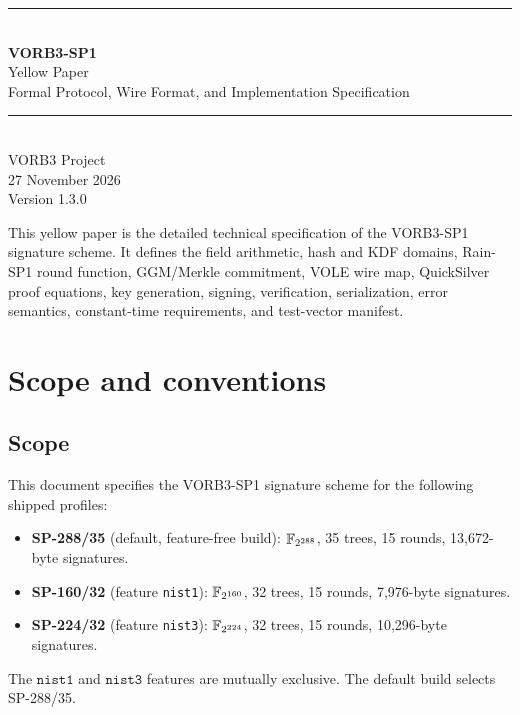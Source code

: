 \documentclass[11pt,a4paper]{article}
\begin{document}
\begin{titlepage}
\centering
\vspace*{2.2cm}
{\color{vorb3blue}\rule{\linewidth}{1.2pt}}\\[0.8cm]
{\Huge\bfseries VORB3-SP1}\\[0.35cm]
{\LARGE Yellow Paper}\\[0.2cm]
{\Large Formal Protocol, Wire Format, and Implementation Specification}\\[0.8cm]
{\color{vorb3blue}\rule{\linewidth}{1.2pt}}\\[1.2cm]

{\large VORB3 Project}\\[0.3cm]
{\large 27 November 2026}\\[0.3cm]
{\large Version 1.3.0}\\[1.0cm]


\vfill
\begin{minipage}{0.9\linewidth}
\small
This yellow paper is the detailed technical specification of the VORB3-SP1
signature scheme. It defines the field arithmetic, hash and KDF domains,
Rain-SP1 round function, GGM/Merkle commitment, VOLE wire map, QuickSilver
proof equations, key generation, signing, verification, serialization, error
semantics, constant-time requirements, and test-vector manifest.
\end{minipage}
\end{titlepage}


\tableofcontents
\newpage

\section{Scope and conventions}

\subsection{Scope}

This document specifies the VORB3-SP1 signature scheme for the following
shipped profiles:
\begin{itemize}
  \item \textbf{SP-288/35} (default, feature-free build): $\mathbb{F}_{2^{288}}$, 35 trees,
        15 rounds, 13,672-byte signatures.
  \item \textbf{SP-160/32} (feature \texttt{nist1}): $\mathbb{F}_{2^{160}}$, 32 trees,
        15 rounds, 7,976-byte signatures.
  \item \textbf{SP-224/32} (feature \texttt{nist3}): $\mathbb{F}_{2^{224}}$, 32 trees,
        15 rounds, 10,296-byte signatures.
\end{itemize}
The $\texttt{nist1}$ and $\texttt{nist3}$ features are mutually exclusive. The
default build selects SP-288/35.
\end{document}
